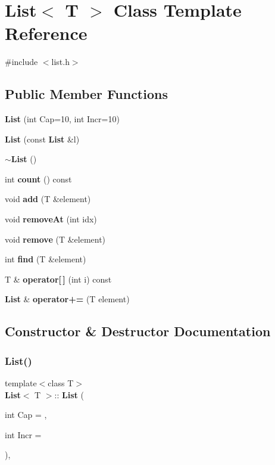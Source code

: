 \section{List$<$ T $>$ Class Template Reference}
\label{class_list}


{\ttfamily \#include $<$list.\+h$>$}

\subsection*{Public Member Functions}
\begin{DoxyCompactItemize}
\item 
\textbf{ List} (int Cap=10, int Incr=10)
\item 
\textbf{ List} (const \textbf{ List} \&l)
\item 
\textbf{ $\sim$\+List} ()
\item 
int \textbf{ count} () const
\item 
void \textbf{ add} (T \&element)
\item 
void \textbf{ remove\+At} (int idx)
\item 
void \textbf{ remove} (T \&element)
\item 
int \textbf{ find} (T \&element)
\item 
T \& \textbf{ operator[$\,$]} (int i) const
\item 
\textbf{ List} \& \textbf{ operator+=} (T element)
\end{DoxyCompactItemize}


\subsection{Constructor \& Destructor Documentation}
\mbox{\label{class_list_a48ef6c59b00fd6c6bbf1604583113e42}} 
\subsubsection{List()\hspace{0.1cm}{\footnotesize\ttfamily [1/2]}}
{\footnotesize\ttfamily template$<$class T$>$ \\
\textbf{ List}$<$ T $>$\+::\textbf{ List} (\begin{DoxyParamCaption}\item[{int}]{Cap = {},  }\item[{int}]{Incr = {} }\end{DoxyParamCaption})\hspace{0.3cm}{\ttfamily [inline]}, {\ttfamily [explicit]}}

